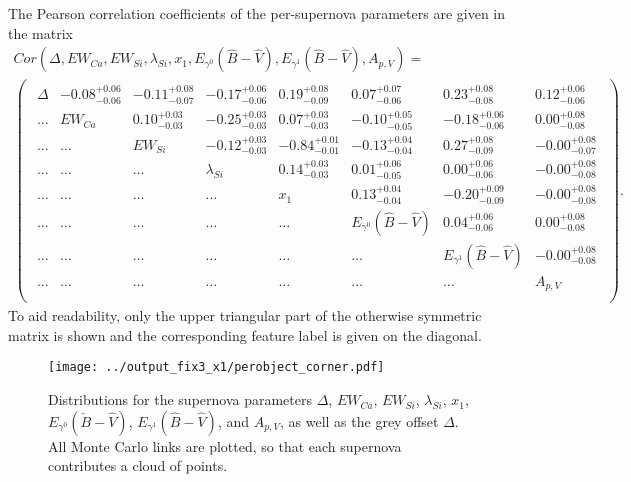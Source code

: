 \documentclass[trackchanges]{aastex61}   	%
\begin{document}
{The Pearson correlation coefficients of the per-supernova parameters are given in the matrix
\begin{multline}
Cor(\Delta, EW_{Ca}, EW_{Si}, \lambda_{Si}, x_1, E_{\gamma^0}({\hat{B}}-{\hat{V}}), E_{\gamma^1}({\hat{B}}-{\hat{V}}), A_{p,V}) =\\
\begin{pmatrix}
\begin{array}{rrrrrrrr}
\Delta& -0.08^{+0.06}_{-0.06} & -0.11^{+0.08}_{-0.07} & -0.17^{+0.06}_{-0.06} & 0.19^{+0.08}_{-0.09} & 0.07^{+0.07}_{-0.06} & 0.23^{+0.08}_{-0.08} & 0.12^{+0.06}_{-0.06} \\
\ldots  & EW_{Ca} & 0.10^{+0.03}_{-0.03} & -0.25^{+0.03}_{-0.03} & 0.07^{+0.03}_{-0.03} & -0.10^{+0.05}_{-0.05} & -0.18^{+0.06}_{-0.06} & 0.00^{+0.08}_{-0.08} \\
\ldots & \ldots &EW_{Si}  & -0.12^{+0.03}_{-0.03} & -0.84^{+0.01}_{-0.01} & -0.13^{+0.04}_{-0.04} & 0.27^{+0.08}_{-0.09} & -0.00^{+0.08}_{-0.07} \\
\ldots  & \ldots  & \ldots  &  \lambda_{Si}& 0.14^{+0.03}_{-0.03} & 0.01^{+0.06}_{-0.05} & 0.00^{+0.06}_{-0.06} & -0.00^{+0.08}_{-0.08} \\
\ldots  &\ldots  &\ldots & \ldots & x_1 & 0.13^{+0.04}_{-0.04} & -0.20^{+0.09}_{-0.09} & -0.00^{+0.08}_{-0.08} \\
\ldots  &\ldots  & \ldots  &\ldots  & \ldots  & E_{\gamma^0}({\hat{B}}-{\hat{V}})& 0.04^{+0.06}_{-0.06} & 0.00^{+0.08}_{-0.08} \\
\ldots  & \ldots &\ldots  & \ldots  & \ldots & \ldots  &E_{\gamma^1}({\hat{B}}-{\hat{V}})  & -0.00^{+0.08}_{-0.08} \\
\ldots  & \ldots & \ldots & \ldots  & \ldots  & \ldots  &\ldots  & A_{p,V} \\
\end{array}
\end{pmatrix}.
\label{corr:eqn}
\end{multline}
To aid readability, only the upper triangular part of the otherwise symmetric matrix is shown and the corresponding feature label is given on
the diagonal.

\begin{figure}[htbp] %
   \centering
   \texttt{[image: ../output\_fix3\_x1/perobject\_corner.pdf]} 
   \caption{
   Distributions for the supernova parameters $\Delta$, $EW_{Ca}$, $EW_{Si}$, $\lambda_{Si}$, $x_1$, $E_{\gamma^0}({\hat{B}}-{\hat{V}})$,  $E_{\gamma^1}({\hat{B}}-{\hat{V}})$,  and  $A_{p,V}$, as well as the grey offset
$\Delta$.  All Monte Carlo links are plotted, so that each supernova contributes a cloud of points.
   \label{perobject3:fig}}
\end{figure}

}
\end{document}
